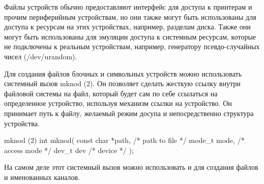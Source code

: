 Файлы устройств обычно предоставляют интерфейс для доступа к принтерам и прочим периферийным устройствам, но они также могут быть использованы для доступа к ресурсам на этих устройствах, например, разделам диска. Также они могут быть использованы для эмуляции доступа к системным ресурсам, которые не подключены к реальным устройствам, например, генератору псевдо-случайных чисел (/dev/urandom).

Для создания файлов блочных и символьных устройств можно использовать системный вызов mknod (2). Он позволяет сделать жесткую ссылку внутри файловой системы на файл, который будет сам по себе ссылаться на определенное устройство, используя механизм ссылки на устройство. Он принимает путь к файлу, желаемый режим досупа и непосредственно структура устройства.

\begin{CCode}{mknod (2)}
	int mknod( 
		const char *path, /* path to file */ 
		mode_t mode, 	  /* access mode */ 
		dev_t dev 		  /* device */
	); \end{CCode}

\begin{important}
	На самом деле этот системный вызов можно использовать и для создания файлов и именованных каналов.
\end{important}
